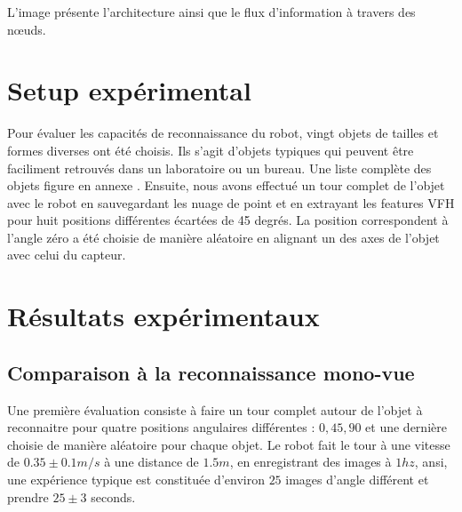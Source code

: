 L'image \celine{ \ref{}} présente l'architecture ainsi que le flux d'information à travers des nœuds.

\section{Setup expérimental}
Pour évaluer les capacités de reconnaissance du robot, vingt objets de tailles et formes diverses ont été choisis. Ils s'agit d'objets typiques qui peuvent être faciliment retrouvés dans un laboratoire ou un bureau. Une liste complète des objets figure en annexe \celine{\ref{}}. Ensuite, nous avons effectué un tour complet de l'objet avec le robot en sauvegardant les nuage de point et en extrayant les features VFH pour huit positions différentes écartées de 45 degrés. La position correspondent à l'angle zéro a été choisie de manière aléatoire en alignant un des axes de l'objet avec celui du capteur. 

\begin{figure}[H]
	\caption{}
	\label{fig:setup_expe}
\end{figure}

\section{Résultats expérimentaux}
\subsection{Comparaison à la reconnaissance mono-vue}
Une première évaluation consiste à faire un tour complet autour de l'objet à reconnaitre pour quatre positions angulaires différentes : $0, 45, 90$ et une dernière choisie de manière aléatoire pour chaque objet. Le robot fait le tour à une vitesse de $0.35 \pm 0.1 m/s$ à une distance de $1.5m$, en enregistrant des images à $1hz$, ansi, une expérience typique est constituée d'environ $25$  images d'angle différent et prendre $25 \pm 3$ seconds. 

